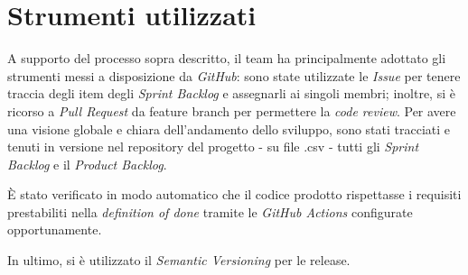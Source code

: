 \section{Strumenti utilizzati}\label{sec:strumenti-utilizzati}
A supporto del processo sopra descritto, il team ha principalmente adottato gli strumenti messi a disposizione da
\textit{GitHub}: sono state utilizzate le \textit{Issue} per tenere traccia degli item degli \textit{Sprint Backlog} e
assegnarli ai singoli membri;
inoltre, si è ricorso a \textit{Pull Request} da feature branch per permettere la \textit{code review}.
Per avere una visione globale e chiara dell'andamento dello sviluppo, sono stati tracciati e tenuti in versione nel
repository del progetto - su file .csv - tutti gli \textit{Sprint Backlog} e il \textit{Product Backlog}.

È stato verificato in modo automatico che il codice prodotto rispettasse i requisiti prestabiliti nella
\textit{definition of done} tramite le \textit{GitHub Actions} configurate opportunamente.

In ultimo, si è utilizzato il \textit{Semantic Versioning} per le release.
